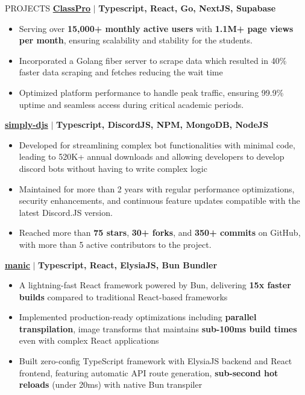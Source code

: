 \documentclass{resume} %
\begin{document}
\begin{rSection}{PROJECTS}    
    \textbf{\href{https://github.com/Rahuletto/ClassPro}{ClassPro}} \(\mid\) \textbf{Typescript, React, Go, NextJS, Supabase}
\begin{itemize}
\itemsep -3pt{}
\item Serving over \textbf{15,000+ monthly active users} with \textbf{1.1M+ page views per month}, ensuring scalability and stability for the students.
\item Incorporated a Golang fiber server to scrape data which resulted in 40\% faster data scraping and fetches reducing the wait time
\item Optimized platform performance to handle peak traffic, ensuring 99.9\% uptime and seamless access during critical academic periods.
\end{itemize}
\textbf{\href{https://github.com/Rahuletto/simply-djs}{simply-djs}} \(\mid\) \textbf{Typescript, DiscordJS, NPM, MongoDB, NodeJS}
\begin{itemize}
\itemsep -3pt{}
\item Developed for streamlining complex bot functionalities with minimal code, leading to 520K+ annual downloads and allowing developers to develop discord bots without having to write complex logic
\item Maintained for more than 2 years with regular performance optimizations, security enhancements, and continuous feature updates compatible with the latest Discord.JS version.
\item Reached more than \textbf{75 stars}, \textbf{30+ forks}, and \textbf{350+ commits} on GitHub, with more than 5 active contributors to the project.
\end{itemize}
\textbf{\href{https://github.com/Rahuletto/manic}{manic}} \(\mid\) \textbf{Typescript, React, ElysiaJS, Bun Bundler}
\begin{itemize}
\itemsep -3pt{}
\item A lightning-fast React framework powered by Bun, delivering \textbf{15x faster builds} compared to traditional React-based frameworks
\item Implemented production-ready optimizations including \textbf{parallel transpilation}, image transforms that maintains \textbf{sub-100ms build times} even with complex React applications
\item Built zero-config TypeScript framework with ElysiaJS backend and React frontend, featuring automatic API route generation, \textbf{sub-second hot reloads} (under 20ms) with native Bun transpiler
\end{itemize}
\end{rSection}
\end{document}

